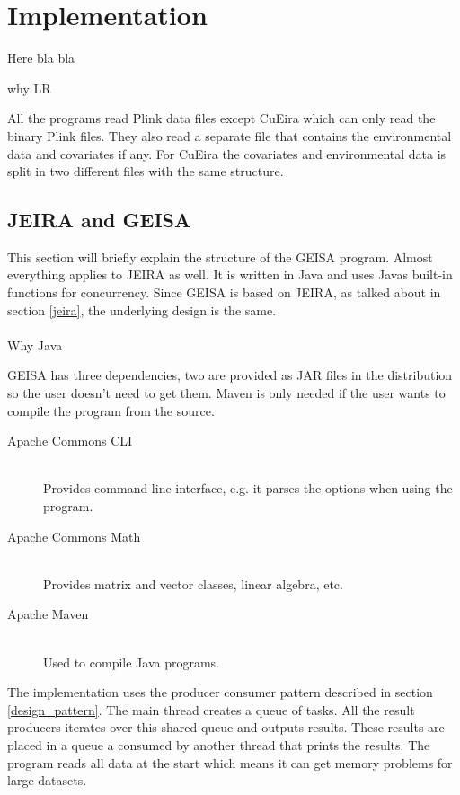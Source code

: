 \documentclass[10pt,a4paper]{report}
\begin{document}
\newpage
\section{Implementation}
\label{implementation}
Here bla bla

why LR

All the programs read Plink data files except CuEira which can only read the binary Plink files. They also read a separate file that contains the environmental data and covariates if any. For CuEira the covariates and environmental data is split in two different files with the same structure. %

\subsection{JEIRA and GEISA}
This section will briefly explain the structure of the GEISA program. Almost everything applies to JEIRA as well. It is written in Java and uses Javas built-in functions for concurrency. Since GEISA is based on JEIRA, as talked about in section \ref{jeira}, the underlying design is the same.\\
\\
Why Java

GEISA has three dependencies, two are provided as JAR files in the distribution so the user doesn't need to get them. Maven is only needed if the user wants to compile the program from the source.

\begin{description}
  \item[Apache Commons CLI] \hfill \\
  Provides command line interface, e.g. it parses the options when using the program.
  \item[Apache Commons Math] \hfill \\
  Provides matrix and vector classes, linear algebra, etc.
  \item[Apache Maven] \hfill \\
  Used to compile Java programs.
\end{description}

The implementation uses the producer consumer pattern described in section \ref{design_pattern}. The main thread creates a queue of tasks. All the result producers iterates over this shared queue and outputs results. These results are placed in a queue a consumed by another thread that prints the results. The program reads all data at the start which means it can get memory problems for large datasets.
\end{document}
